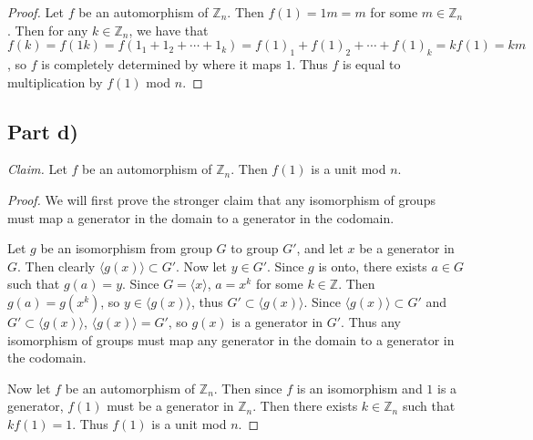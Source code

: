 \documentclass{abrice}
\newcommand{\Z}{\mathbb{Z}}
\newcommand{\Claim}{\noindent\emph{Claim.}\xspace}%
\begin{document}
\begin{proof}
  Let $f$ be an automorphism of $\Z_n$. Then $f(1) = 1m = m$ for some $m \in
  \Z_n$. Then for any $k \in \Z_n$, we have that $f(k) = f(1k) = f(1_1 + 1_2 +
  \cdots + 1_k) = {f(1)}_1 + {f(1)}_2 + \cdots + {f(1)}_k = k f(1) = km$, so $f$
  is completely determined by where it maps $1$. Thus $f$ is equal to
  multiplication by $f(1)$ mod $n$.
\end{proof}

\subsection{Part d)}

\Claim Let $f$ be an automorphism of $\Z_n$. Then $f(1)$ is a unit mod $n$.

\begin{proof}
  We will first prove the stronger claim that any isomorphism of groups must map
  a generator in the domain to a generator in the codomain.

  Let $g$ be an isomorphism from group $G$ to group $G'$, and let $x$ be a
  generator in $G$. Then clearly $\langle g(x) \rangle \subset G'$. Now let $y
  \in G'$. Since $g$ is onto, there exists $a \in G$ such that $g(a) = y$. Since
  $G = \langle x \rangle$, $a = x^k$ for some $k \in \Z$. Then $g(a) = g(x^k)$,
  so $y \in \langle g(x) \rangle$, thus $G' \subset \langle g(x) \rangle$. Since
  $\langle g(x) \rangle \subset G'$ and $G' \subset \langle g(x) \rangle$,
  $\langle g(x) \rangle = G'$, so $g(x)$ is a generator in $G'$. Thus any
  isomorphism of groups must map any generator in the domain to a generator in
  the codomain.

  Now let $f$ be an automorphism of $\Z_n$. Then since $f$ is an isomorphism and
  $1$ is a generator, $f(1)$ must be a generator in $\Z_n$. Then there exists $k
  \in \Z_n$ such that $kf(1) = 1$. Thus $f(1)$ is a unit mod $n$.
\end{proof}
\end{document}
